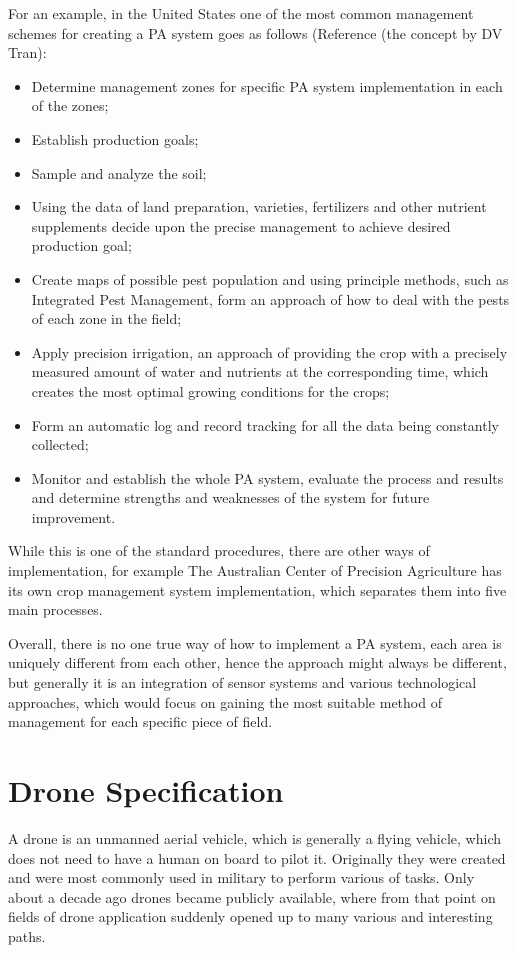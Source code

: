 \documentclass[11pt,a5paper,footinclude=true,headinclude=true, oneside]{scrbook}
\begin{document}
For an example, in the United States one of the most common management schemes for creating a PA system goes as follows (Reference (the concept by DV Tran):
\begin{itemize}
    \item Determine management zones for specific PA system implementation in each of the zones;
    \item Establish production goals;
    \item Sample and analyze the soil;
    \item Using the data of land preparation, varieties, fertilizers and other nutrient supplements decide upon the precise management to achieve desired production goal;
    \item Create maps of possible pest population and using principle methods, such as Integrated Pest Management, form an approach of how to deal with the pests of each zone in the field;
    \item Apply precision irrigation, an approach of providing the crop with a precisely measured amount of water and nutrients at the corresponding time, which creates the most optimal growing conditions for the crops;
    \item Form an automatic log and record tracking for all the data being constantly collected;
    \item Monitor and establish the whole PA system, evaluate the process and results and determine strengths and weaknesses of the system for future improvement.
\end{itemize}

While this is one of the standard procedures, there are other ways of implementation, for example The Australian Center of Precision Agriculture has its own crop management system implementation, which separates them into five main processes. 

Overall, there is no one true way of how to implement a PA system, each area is uniquely different from each other, hence the approach might always be different, but generally it is an integration of sensor systems and various technological approaches, which would focus on gaining the most suitable method of management for each specific piece of field.

\chapter{Drone Specification}

A drone is an unmanned aerial vehicle, which is generally a flying vehicle, which does not need to have a human on board to pilot it. Originally they were created and were most commonly used in military to perform various of tasks. Only about a decade ago drones became publicly available, where from that point on fields of drone application suddenly opened up to many various and interesting paths.
\end{document}
